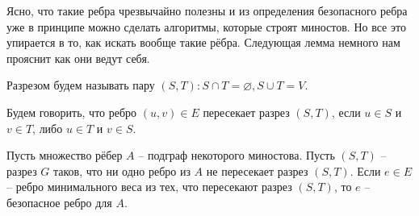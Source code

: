 Ясно, что такие ребра чрезвычайно полезны и из определения безопасного ребра уже в принципе можно сделать алгоритмы, которые строят миностов. 
Но все это упирается в то, как искать вообще такие рёбра. Следующая лемма немного нам прояснит как они ведут себя.

\Def Разрезом будем называть пару $(S, T): S \cap T = \varnothing, S \cup T = V$.

\Def Будем говорить, что ребро $(u, v) \in E$ пересекает разрез $(S, T)$, если $u \in S$ и $v \in T$, либо $u \in T$ и $v \in S$.

 Пусть множество рёбер $A$ -- подграф некоторого миностова. Пусть $(S, T)$ -- разрез $G$ таков, что ни одно ребро из $A$ не пересекает разрез $(S, T)$.
Если $e \in E$ -- ребро минимального веса из тех, что пересекают разрез $(S, T)$, то $e$ -- безопасное ребро для $A$.
